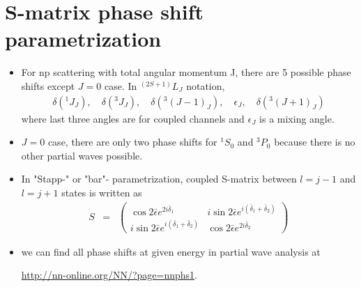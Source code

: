 \documentclass[10pt]{book}
\newcommand{\bea}{\begin{eqnarray}}
\newcommand{\eea}{\end{eqnarray}}
\begin{document}
\section{S-matrix phase shift parametrization}
\begin{itemize}
\item For np scattering with total angular momentum J,
      there are 5 possible phase shifts except $J=0$ case.
      In $^{(2S+1)}L_J$ notation, 
      \bea
       \delta(^1J_J),\quad \delta(^3J_J),
       \quad \delta(^3(J-1)_J),\quad \epsilon_J,\quad \delta(^3(J+1)_J)
      \eea  
      where last three angles are for coupled channels and
      $\epsilon_J$ is a mixing angle.  
\item $J=0$ case, there are only two phase shifts for $^1S_0$ and $^3P_0$
      because there is no other partial waves possible.

\item 
In "Stapp-" or "bar"- parametrization, 
coupled S-matrix between $l=j-1$ and $l=j+1$ states
is written as
\bea
S&=&\left(
\begin{array}{cc}
\cos 2\bar{\epsilon} e^{2i\bar{\delta}_1} & i\sin 2\bar{\epsilon} e^{i(\bar{\delta}_1+\bar{\delta}_2)} \\
i\sin 2\bar{\epsilon} e^{i(\bar{\delta}_1+\bar{\delta}_2)} & \cos 2\bar{\epsilon} e^{2i\bar{\delta}_2}
\end{array}
\right)
\eea
\item we can find all phase shifts at given energy in partial wave analysis at 

      \url{http://nn-online.org/NN/?page=nnphs1}.
\end{itemize}
\end{document}

